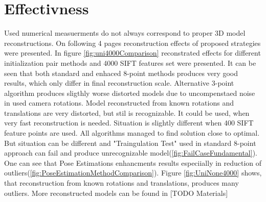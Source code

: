\section{Effectivness}
Used numerical measuerments do not always correspond to proper 3D model reconstructions. On following 4 pages reconstruction effects of proposed strategies were presented. In figure \ref{fig:uni4000Comparison} reconstrated effects for different initialization pair methods and 4000 SIFT features set were presented. It can be seen that both standard and enhaced 8-point methods produces very good results, which only differ in final reconstruction scale. Alternative 3-point algorithm produces sligthly worse distorted models due to uncompenstaed noise in used camera rotations. Model reconstructed from known rotations and translations are very distorted, but stil is recognizable. It could be used, when very fast reconstruction is needed.
\newline
Situation is slightly different when 400 SIFT feature points are used. All algorithms managed to find solution close to optimal. But situation can be different and "Traingulation Test" used in standard 8-point approach can fail and produce unrecognizable model(\ref{fig:FailCaseFundamental}).
\newline
One can see that Pose Estimations enhancments results especiially in reduction of outliers(\ref{fig:PoseEstimationMethodComparison}).
\newline
Figure \ref{fig:UniNone4000} shows, that reconstruction from known rotations and translations, produces many outliers.
\newline
More reconstructed models can be found in [TODO Materials]
